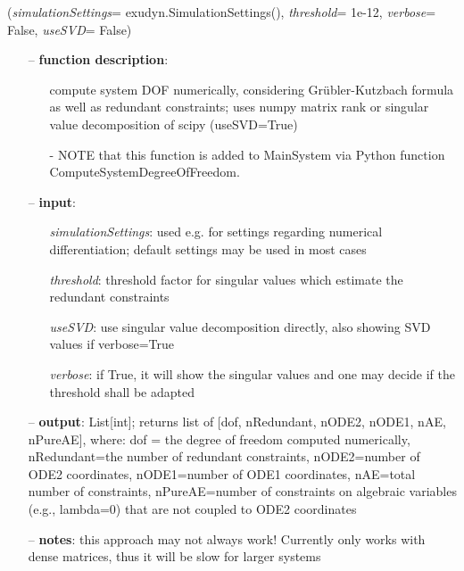 %
\begin{flushleft}
\label{sec:mainsystemextensions:ComputeSystemDegreeOfFreedom}
({\it simulationSettings}= exudyn.SimulationSettings(), {\it threshold}= 1e-12, {\it verbose}= False, {\it useSVD}= False)
\end{flushleft}
\setlength{\itemindent}{0.7cm}
\begin{itemize}[leftmargin=0.7cm]
\item[--]
{\bf function description}: \vspace{-6pt}
\begin{itemize}[leftmargin=1.2cm]
\setlength{\itemindent}{-0.7cm}
\item[]compute system DOF numerically, considering Gr{\"u}bler-Kutzbach formula as well as redundant constraints; uses numpy matrix rank or singular value decomposition of scipy (useSVD=True)
\item[]- NOTE that this function is added to MainSystem via Python function ComputeSystemDegreeOfFreedom.
\end{itemize}
\item[--]
{\bf input}: \vspace{-6pt}
\begin{itemize}[leftmargin=1.2cm]
\setlength{\itemindent}{-0.7cm}
\item[]{\it simulationSettings}: used e.g. for settings regarding numerical differentiation; default settings may be used in most cases
\item[]{\it threshold}: threshold factor for singular values which estimate the redundant constraints
\item[]{\it useSVD}: use singular value decomposition directly, also showing SVD values if verbose=True
\item[]{\it verbose}: if True, it will show the singular values and one may decide if the threshold shall be adapted
\end{itemize}
\item[--]
{\bf output}: List[int]; returns list of [dof, nRedundant, nODE2, nODE1, nAE, nPureAE], where: dof = the degree of freedom computed numerically, nRedundant=the number of redundant constraints, nODE2=number of ODE2 coordinates, nODE1=number of ODE1 coordinates, nAE=total number of constraints, nPureAE=number of constraints on algebraic variables (e.g., lambda=0) that are not coupled to ODE2 coordinates
\item[--]
{\bf notes}: this approach may not always work! Currently only works with dense matrices, thus it will be slow for larger systems
\vspace{12pt}\end{itemize}
%

